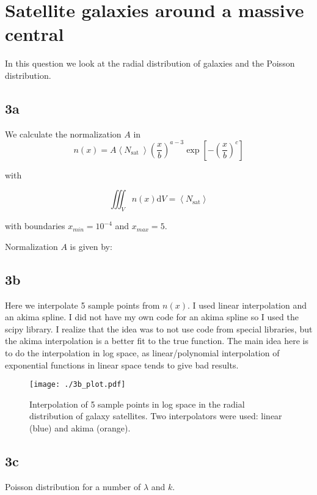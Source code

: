 \section{Satellite galaxies around a massive central}

In this question we look at the radial distribution of galaxies and the Poisson distribution.



\subsection{3a}

We calculate the normalization $A$ in
\begin{equation}
n(x)=A\left\langle N_{\text {sat }}\right\rangle\left(\frac{x}{b}\right)^{a-3} \exp \left[-\left(\frac{x}{b}\right)^{c}\right]
\end{equation}

with 

\begin{equation}
\iiint_{V} n(x) \mathrm{d} V=\left\langle N_{\mathrm{sat}}\right\rangle
\end{equation}

with boundaries $x_{min} = 10^{-4}$ and $x_{max} = 5$.



Normalization $A$ is given by:



\subsection{3b}



Here we interpolate 5 sample points from $n(x)$. I used linear interpolation and an akima spline. I did not have my own code for an akima spline so I used the scipy library. I realize that the idea was to not use code from special libraries, but the akima interpolation is a better fit to the true function. The main idea here is to do the interpolation in log space, as linear/polynomial interpolation of exponential functions in linear space tends to give bad results. 

\begin{figure}[h!]
  \centering
  \texttt{[image: ./3b\_plot.pdf]}
  \caption{Interpolation of 5 sample points in log space in the radial distribution of galaxy satellites. Two interpolators were used: linear (blue) and akima (orange).}
  \label{fig:3b}
\end{figure}

\newpage

\subsection{3c}



Poisson distribution for a number of $\lambda$ and $k$.





